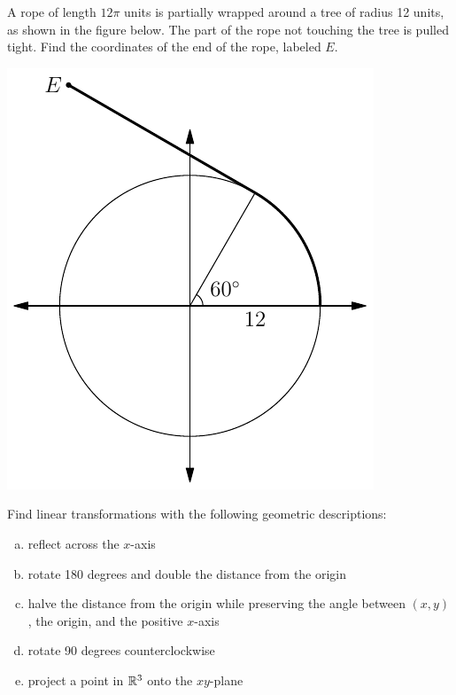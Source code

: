 \documentclass[prettycode,shellescape]{watsonbook}
\begin{document}
\begin{aexercise}
  A rope of length $12\pi$ units is partially wrapped around a tree of
  radius 12 units, as shown in the figure below. The part of the rope
  not touching the tree is pulled tight. Find the coordinates of the
  end of the rope, labeled $E$.
  \begin{center}
    \includegraphics{exercisefigures/ropetree}
  \end{center}
\end{aexercise}

\newpage 


\begin{aexercise}
  Find linear transformations with the following geometric
  descriptions: 
  \begin{enumerate}[(a)]
  \item reflect across the $x$-axis
  \item rotate 180 degrees and double the distance from the origin
  \item halve the distance from the origin while preserving the angle
    between $(x,y)$, the origin, and the positive $x$-axis
  \item  rotate 90 degrees counterclockwise
  \item project a point in $\mathbb{R}^3$ onto the $xy$-plane
  \end{enumerate}
\end{aexercise}
\end{document}
